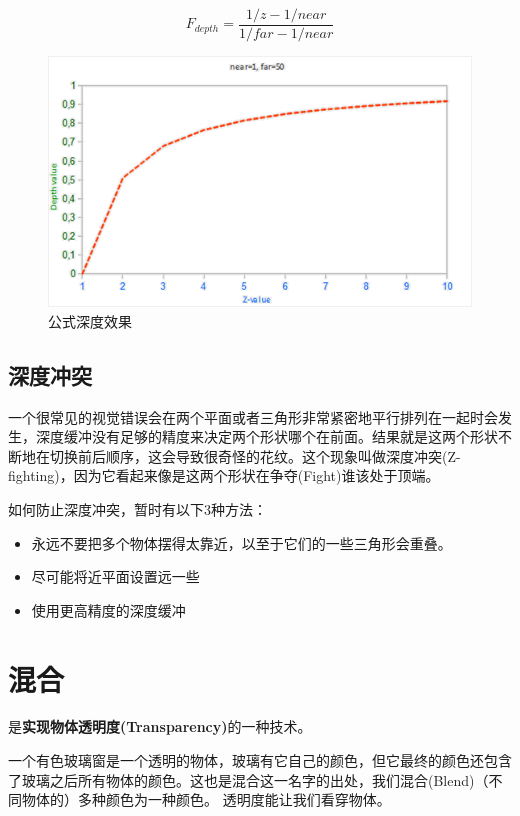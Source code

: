 \documentclass[UTF8,a4paper,12pt]{ctexbook}
\begin{document}
			$$ F_{depth} = \dfrac{1/z - 1/near}{1/far - 1/near}$$
			
			
			\begin{figure}[H]
				\centering
				\includegraphics[width=.9\linewidth]{depth_non_linear_graph}
				\caption{公式深度效果}
			\end{figure}
			
			
			
		\subsection{深度冲突}
			一个很常见的视觉错误会在两个平面或者三角形非常紧密地平行排列在一起时会发生，深度缓冲没有足够的精度来决定两个形状哪个在前面。结果就是这两个形状不断地在切换前后顺序，这会导致很奇怪的花纹。这个现象叫做深度冲突(Z-fighting)，因为它看起来像是这两个形状在争夺(Fight)谁该处于顶端。
			
			如何防止深度冲突，暂时有以下3种方法：
			\begin{itemize}
				\item 永远不要把多个物体摆得太靠近，以至于它们的一些三角形会重叠。
				\item 尽可能将近平面设置远一些
				\item 使用更高精度的深度缓冲
			\end{itemize}
		
		
	\section{混合}
		是\textbf{实现物体透明度(Transparency)}的一种技术。
	
		一个有色玻璃窗是一个透明的物体，玻璃有它自己的颜色，但它最终的颜色还包含了玻璃之后所有物体的颜色。这也是混合这一名字的出处，我们混合(Blend)（不同物体的）多种颜色为一种颜色。 透明度能让我们看穿物体。
		
\end{document}

